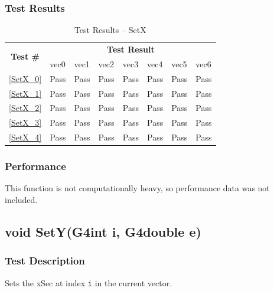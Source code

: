 \documentclass[12pt]{article}
\begin{document}
	\subsubsection{Test Results}
		\begin{table}[H]
		\centering
		\caption{Test Results -- SetX}\label{SetX_acc}
		\begin{tabular}{clllllll}
		\toprule
		\multirow{2}{*}{\bf Test \#} & \multicolumn{7}{c}{\bf Test Result}\\
		& vec0 & vec1 & vec2 & vec3 & vec4 & vec5 & vec6\\\midrule
		\ref{SetX_0} & Pass & Pass & Pass & Pass & Pass & Pass & Pass\\
		\ref{SetX_1} & Pass & Pass & Pass & Pass & Pass & Pass & Pass\\
		\ref{SetX_2} & Pass & Pass & Pass & Pass & Pass & Pass & Pass\\
		\ref{SetX_3} & Pass & Pass & Pass & Pass & Pass & Pass & Pass\\
		\ref{SetX_4} & Pass & Pass & Pass & Pass & Pass & Pass & Pass\\
		\bottomrule
		\end{tabular}
		\end{table}

	\subsubsection{Performance}
		This function is not computationally heavy, so performance data was not included.

\subsection{void SetY(G4int i, G4double e)} %
	\subsubsection{Test Description}
	Sets the xSec at index \texttt{i} in the current vector. 
	
\end{document}
